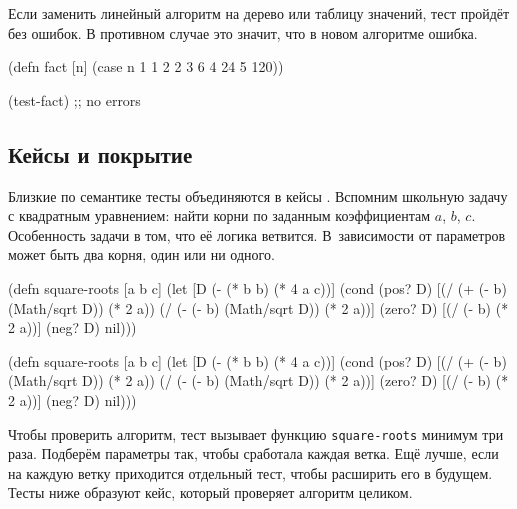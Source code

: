 Если заменить линейный алгоритм на дерево или таблицу значений, тест пройдёт без
ошибок. В противном случае это значит, что в новом алгоритме ошибка.

\begin{english}
  \begin{clojure}
(defn fact [n]
  (case n
    1 1
    2 2
    3 6
    4 24
    5 120))

(test-fact) ;; no errors
  \end{clojure}
\end{english}

\subsection{Кейсы и покрытие}


Близкие по семантике тесты объединяются в кейсы . Вспомним
школьную задачу с квадратным уравнением: найти корни по заданным коэффициентам
$a$, $b$, $c$. Особенность задачи в том, что её логика ветвится. В~зависимости
от параметров может быть два корня, один или ни одного.


\ifnarrow

\begin{english}
  \begin{clojure}
(defn square-roots [a b c]
  (let [D (- (* b b) (* 4 a c))]
    (cond
      (pos? D)
      [(/ (+ (- b) (Math/sqrt D))
          (* 2 a))
       (/ (- (- b) (Math/sqrt D))
          (* 2 a))]
      (zero? D) [(/ (- b) (* 2 a))]
      (neg? D) nil)))
  \end{clojure}
\end{english}

\else

\begin{english}
  \begin{clojure}
(defn square-roots [a b c]
  (let [D (- (* b b) (* 4 a c))]
    (cond
      (pos? D) [(/ (+ (- b) (Math/sqrt D)) (* 2 a))
                (/ (- (- b) (Math/sqrt D)) (* 2 a))]
      (zero? D) [(/ (- b) (* 2 a))]
      (neg? D) nil)))
  \end{clojure}
\end{english}

\fi


Чтобы проверить алгоритм, тест вызывает функцию \texttt{square\--roots} минимум три
раза. Подберём параметры так, чтобы сработала каждая ветка. Ещё лучше, если на
каждую ветку приходится отдельный тест, чтобы расширить его в будущем. Тесты ниже
образуют кейс, который проверяет алгоритм целиком.

